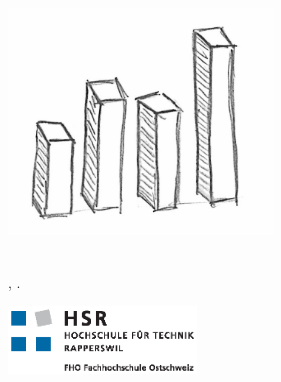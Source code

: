 
\begin{titlepage}

\begin{addmargin}[-1cm]{-3cm}
\begin{center}
\large

\hfill
\vfill

\begingroup
\color{Maroon}{\LARGE\spacedallcaps{\myTitle}}\\ \bigskip %
\endgroup

\spacedlowsmallcaps{\myName} %

\vfill

\includegraphics[width=7cm]{images/bars} \\ \medskip %

\mySubtitle \\ %
\myThesis, \myTime. \\

\vspace{2cm}

\includegraphics[width=5cm]{images/HSR_Logo_CMYK} \medskip


\end{center}
\end{addmargin}

\end{titlepage}
